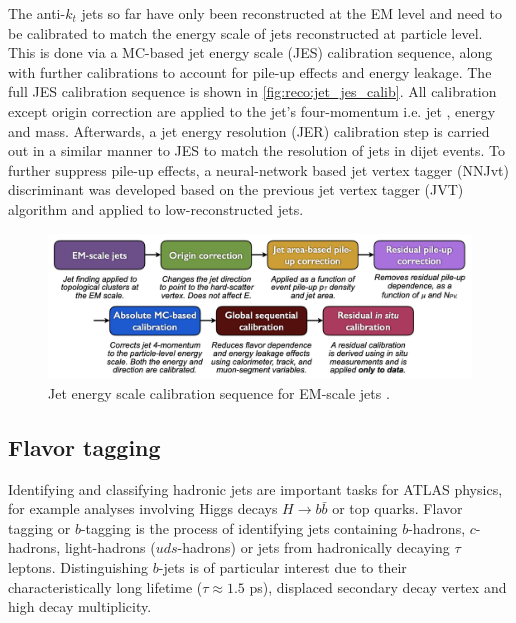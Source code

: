 \documentclass[../thesis.tex]{subfiles}
\begin{document}
The anti-$k_t$ jets so far have only been reconstructed at the \acs{EM} level and need to be calibrated to match the energy scale of jets reconstructed at particle level. This is done via a \acs{MC}-based jet energy scale (\acs{JES}) calibration sequence, along with further calibrations to account for pile-up effects and energy leakage. The full \acs{JES} calibration sequence is shown in \autoref{fig:reco:jet_jes_calib}. All calibration except origin correction are applied to the jet's four-momentum i.e. jet \pT, energy and mass. Afterwards, a jet energy resolution (\acs{JER}) \citep{reco:jet_jer} calibration step is carried out in a similar manner to \acs{JES} to match the resolution of jets in dijet events.
To further suppress pile-up effects, a neural-network based jet vertex tagger (\acs{NNJvt}) discriminant was developed based on the previous jet vertex tagger (\acs{JVT}) algorithm \citep{reco:pileup} and applied to low-\pT reconstructed jets.

\begin{figure}[!htbp]
\begin{center}
\includegraphics[width=\linewidth]{fig/reco_jet_jes_calib.png}
\caption[Jet energy scale calibration sequence for EM-scale jets.]{\label{fig:reco:jet_jes_calib}Jet energy scale calibration sequence for \acs{EM}-scale jets \citep{reco:jet_jes}.}
\end{center}
\end{figure}


\subsection{Flavor tagging}
\label{sec:ftag}
Identifying and classifying hadronic jets are important tasks for ATLAS physics, for example analyses involving Higgs decays $H\rightarrow b\bar{b}$ or top quarks. Flavor tagging or $b$-tagging is the process of identifying jets containing $b$-hadrons, $c$-hadrons, light-hadrons ($uds$-hadrons) or jets from hadronically decaying $\tau$ leptons. Distinguishing $b$-jets is of particular interest due to their characteristically long lifetime ($\tau\approx 1.5$ ps), displaced secondary decay vertex and high decay multiplicity.
\end{document}
